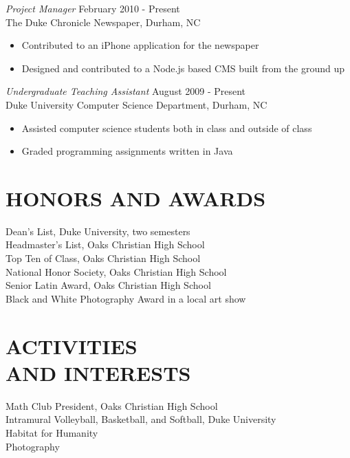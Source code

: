 \documentclass[line,margin]{res}
\begin{document}
\begin{resume}
	{\sl Project Manager} \hfill February 2010 - Present \\
        The Duke Chronicle Newspaper, Durham, NC
        \begin{itemize}  \itemsep -2pt %
        	\item Contributed to an iPhone application for the newspaper
			\item Designed and contributed to a Node.js based CMS built from the ground up
        \end{itemize}

	{\sl Undergraduate Teaching Assistant} \hfill August 2009 - Present \\
        Duke University Computer Science Department, Durham, NC
        \begin{itemize}  \itemsep -2pt %
            \item Assisted computer science students both in class and outside of class
			\item Graded programming assignments written in Java
        \end{itemize}
                

\section{HONORS AND AWARDS}
	Dean's List, Duke University, two semesters \\
	Headmaster's List, Oaks Christian High School \\
	Top Ten of Class, Oaks Christian High School \\
	National Honor Society, Oaks Christian High School \\
	Senior Latin Award, Oaks Christian High School \\
	Black and White Photography Award in a local art show

\section{ACTIVITIES \\ AND INTERESTS}             
 	Math Club President, Oaks Christian High School \\
	Intramural Volleyball, Basketball, and Softball, Duke University \\
	Habitat for Humanity \\
	Photography
\end{resume}
\end{document}
